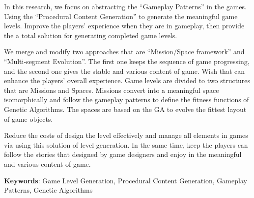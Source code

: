 In this research, we focus on abstracting the ``Gameplay Patterns'' in the games. Using the ``Procedural Content Generation'' to generate the meaningful game levels. Improve the players' experience when they are in gameplay, then provide the a total solution for generating completed game levels.

We merge and modify two approaches that are ``Mission/Space framework'' and ``Multi-segment Evolution''. The first one keeps the sequence of game progressing, and the second one gives the stable and various content of game. Wish that can enhance the players' overall experience. Game levels are divided to two structures that are Missions and Spaces. Missions convert into a meaningful space isomorphically and follow the gameplay patterns to define the fitness functions of Genetic Algorithms. The spaces are based on the GA to evolve the fittest layout of game objects.

Reduce the costs of design the level effectively and manage all elements in games via using this solution of level generation. In the same time, keep the players can follow the stories that designed by game designers and enjoy in the meaningful and various content of game.

\textbf{Keywords}: Game Level Generation, Procedural Content Generation, Gameplay Patterns, Genetic Algorithms